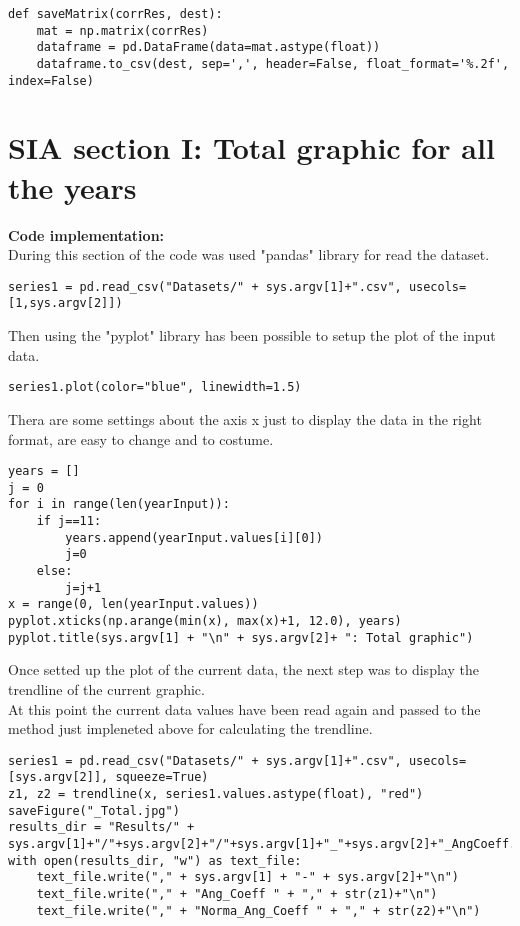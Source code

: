 \begin{lstlisting}
def saveMatrix(corrRes, dest):
	mat = np.matrix(corrRes)
	dataframe = pd.DataFrame(data=mat.astype(float))
	dataframe.to_csv(dest, sep=',', header=False, float_format='%.2f', index=False)
\end{lstlisting}
\section{SIA section I: Total graphic for all the years}
\label{SIA_section_I}
\textbf{Code implementation:}\\
During this section of the code was used "pandas" library for read the dataset.
\begin{lstlisting}
series1 = pd.read_csv("Datasets/" + sys.argv[1]+".csv", usecols=[1,sys.argv[2]])
\end{lstlisting}

Then using the "pyplot" library has been possible to setup the plot of the input data.
\begin{lstlisting}
series1.plot(color="blue", linewidth=1.5)
\end{lstlisting}


Thera are some settings about the axis x just to display the data in the right format, are easy to change and to costume.
\begin{lstlisting}
years = []
j = 0
for i in range(len(yearInput)):
    if j==11:
        years.append(yearInput.values[i][0])
        j=0
    else:
        j=j+1 
x = range(0, len(yearInput.values))
pyplot.xticks(np.arange(min(x), max(x)+1, 12.0), years)
pyplot.title(sys.argv[1] + "\n" + sys.argv[2]+ ": Total graphic")
\end{lstlisting}

Once setted up the plot of the current data, the next step was to display the trendline of the current graphic. \\ 

At this point the current data values have been read again and passed to the method just impleneted above for calculating the trendline.
\begin{lstlisting}
series1 = pd.read_csv("Datasets/" + sys.argv[1]+".csv", usecols=[sys.argv[2]], squeeze=True)
z1, z2 = trendline(x, series1.values.astype(float), "red")
saveFigure("_Total.jpg")
results_dir = "Results/" + sys.argv[1]+"/"+sys.argv[2]+"/"+sys.argv[1]+"_"+sys.argv[2]+"_AngCoeff.csv"
with open(results_dir, "w") as text_file:
	text_file.write("," + sys.argv[1] + "-" + sys.argv[2]+"\n")
	text_file.write("," + "Ang_Coeff " + "," + str(z1)+"\n")
	text_file.write("," + "Norma_Ang_Coeff " + "," + str(z2)+"\n")
\end{lstlisting}


